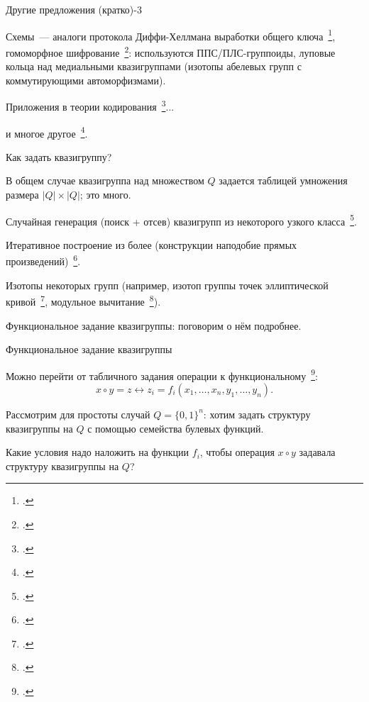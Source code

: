 \begin{frame}{Другие предложения (кратко)-3}
    \begin{coloritemize}
        \item Схемы~--- аналоги протокола Диффи-Хеллмана выработки общего ключа~\footcite{katyshev14, katyshev18}, гомоморфное шифрование~\footcite{gribov2010construction, gribov15, markov20}: используются ППС/ПЛС-группоиды, луповые кольца над медиальными квазигруппами (изотопы абелевых групп с коммутирующими автоморфизмами).
        \pause
        \item Приложения в теории кодирования~\footcite{nechaev98, nechaev04, couselo2004loop, markov12, markov2020nonassociative}...
        \pause 
        \item и многое другое~\footcite{glukhov, artamonov18, shcherbacov2017elements}.
    \end{coloritemize}
\end{frame}


\begin{frame}{Как задать квазигруппу?}
    \begin{coloritemize}
        \item В общем случае квазигруппа над множеством $Q$ задается таблицей умножения размера $\lvert Q \rvert \times \lvert Q \rvert$; это много.
        \pause 
        \item Случайная генерация (поиск + отсев) квазигрупп из некоторого узкого класса~\footcite{gligoroski2008public, chen2010multivariate}.
        \pause 
        \item Итеративное построение из более  (конструкции наподобие прямых произведений)~\footcite{gribovphd, EdonRprime}.
        \pause 
        \item Изотопы некоторых  групп (например, изотоп группы точек эллиптической кривой~\footcite{DH16}, модульное вычитание~\footcite{snavsel2009hash}).
        \pause 
        \item Функциональное задание квазигруппы: поговорим о нём подробнее.
    \end{coloritemize}
\end{frame}


\begin{frame}{Функциональное задание квазигруппы}
    \begin{coloritemize}
        \item Можно перейти от табличного задания операции к функциональному~\footcite{nosov08}: 
        \[
            x \circ y = z \leftrightarrow z_i = f_i(x_1, \ldots, x_n, y_1, \ldots, y_n). 
        \]
        \pause 
        \item Рассмотрим для простоты случай $Q = \{0, 1\}^n$: хотим задать структуру квазигруппы на $Q$ с помощью семейства булевых функций.
        \pause 
        \item Какие условия надо наложить на функции $f_i$, чтобы операция $x \circ y$ задавала структуру квазигруппы на $Q$?
    \end{coloritemize}
\end{frame}


